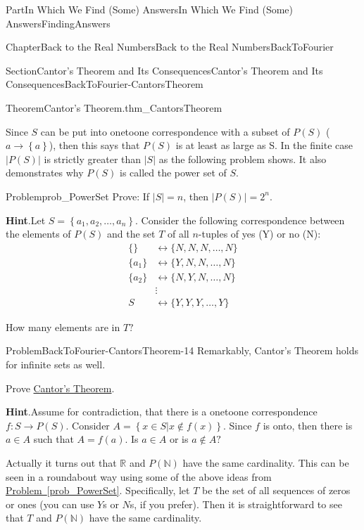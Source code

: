 \documentclass[oneside,10pt,]{book}
\newcommand{\blocktitlefont}{\relax}
\newcommand{\xreffont}{\relax}
\numberwithin{equation}{part}
\newcommand{\abs}[1]{\left|#1\right|}
\newcommand{\RR}{\mathbb {R}}
\newcommand{\NN}{\mathbb {N}}
\newcommand{\amp}{&}
\begin{document}
\begin{partptx}{Part}{In Which We Find (Some) Answers}{}{In Which We Find (Some) Answers}{}{}{FindingAnswers}
\begin{chapterptx}{Chapter}{Back to the Real Numbers}{}{Back to the Real Numbers}{}{}{BackToFourier}
\begin{sectionptx}{Section}{Cantor's Theorem and Its Consequences}{}{Cantor's Theorem and Its Consequences}{}{}{BackToFourier-CantorsTheorem}
\begin{theorem}{Theorem}{Cantor's Theorem.}{}{thm_CantorsTheorem}
\end{theorem}
Since \(S\) can be put into one\textendash{}to\textendash{}one correspondence with a subset of \(P(S)\) (\(a\rightarrow \left\{a\right\}\)), then this says that \(P(S)\) is at least as large as S. In the finite case \(\abs{P(S)}\) is strictly greater than \(\abs{S}\) as the following problem shows.  It also demonstrates why \(P(S)\) is called the power set of \(S\).%
\begin{problem}{Problem}{}{prob_PowerSet}%
Prove: If \(\abs{S}=n\), then \(\abs{ P(S)}=2^n\).%
\par\smallskip%
\noindent\textbf{\blocktitlefont Hint}.\hypertarget{prob_PowerSet-5}{}\quad{}Let \(S=\left\{a_1,a_2,\ldots,a_n\right\}\).  Consider the following correspondence between the elements of \(P(S)\) and the set \(T\) of all \(n\)-tuples of yes (Y) or no (N):%
\begin{align*}
\{ \}  \amp \leftrightarrow \{N,N,N,\ldots,N\}\\
\{a_1\}\amp \leftrightarrow \{Y,N,N,\ldots ,N\}\\
\{a_2\}\amp \leftrightarrow \{N,Y,N,\ldots,N\}\\
\amp \vdots\\
S\amp \leftrightarrow \{Y,Y,Y,\ldots,Y\}
\end{align*}
%
\par
How many elements are in \(T?\)%
\end{problem}
\begin{problem}{Problem}{}{BackToFourier-CantorsTheorem-14}%
Remarkably, Cantor's Theorem holds for infinite sets as well.%
\par
Prove \hyperref[thm_CantorsTheorem]{Cantor's Theorem}.%
\par\smallskip%
\noindent\textbf{\blocktitlefont Hint}.\hypertarget{BackToFourier-CantorsTheorem-14-3}{}\quad{}Assume for contradiction, that there is a one\textendash{}to\textendash{}one correspondence \(f:S\rightarrow P(S)\).  Consider \(A=\left\{x\in S|x\not\in f(x)\right\}\).  Since \(f\) is onto, then there is \(a\in A\) such that \(A=f(a)\).  Is \(a\in A\) or is \(a\not\in A?\)%
\end{problem}
Actually it turns out that \(\RR\) and \(P(\NN)\) have the same cardinality.  This can be seen in a roundabout way using some of the above ideas from \hyperref[prob_PowerSet]{Problem~{\xreffont\ref{prob_PowerSet}}}.  Specifically, let \(T\) be the set of all sequences of zeros or ones (you can use \(Y\)s or \(N\)s, if you prefer).  Then it is straightforward to see that \(T\) and \(P(\NN)\) have the same cardinality.%

\end{sectionptx}
\end{chapterptx}
\end{partptx}
\end{document}
